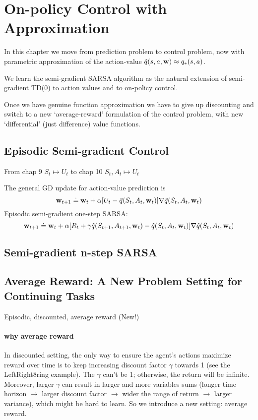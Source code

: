 \documentclass[sutton_barto_notes.tex]{subfiles}
\begin{document}
\newpage
\section{On-policy Control with Approximation}

In this chapter we move from prediction problem to control problem, now with parametric approximation of the action-value $\hat{q}(s,a,{\operatorname*{\mathbf{w}}})\approx q_*(s,a)$.

We learn the semi-gradient SARSA algorithm as the natural extension of semi-gradient TD(0) to action values and to on-policy control.

Once we have genuine function approximation we have to give up discounting and switch to a new `average-reward' formulation of the control problem, with new `differential' (just difference) value functions.

\subsection{Episodic Semi-gradient Control}

From chap 9 $S_t \mapsto U_t$ to chap 10 $S_t, A_t \mapsto U_t$

The general GD update for action-value prediction is
$${\operatorname*{\mathbf{w}}}_{t+1} \doteq {\operatorname*{\mathbf{w}}}_t + \alpha[U_t - \hat{q}(S_t, A_t, {\operatorname*{\mathbf{w}}}_t)]\nabla \hat{q}(S_t, A_t, {\operatorname*{\mathbf{w}}}_t)$$
Episodic semi-gradient one-step SARSA:
$${\operatorname*{\mathbf{w}}}_{t+1} \doteq {\operatorname*{\mathbf{w}}}_t + \alpha[R_{t} + \gamma\hat{q}(S_{t+1}, A_{t+1}, {\operatorname*{\mathbf{w}}}_t) - \hat{q}(S_t, A_t, {\operatorname*{\mathbf{w}}}_t)]\nabla\hat{q}(S_t, A_t, {\operatorname*{\mathbf{w}}}_t)$$

\subsection{Semi-gradient n-step SARSA}
\subsection{Average Reward: A New Problem Setting for Continuing Tasks}
Episodic, discounted, average reward (New!)

\paragraph{why average reward} In discounted setting, the only way to ensure the agent's actions maximize reward over time is to keep increasing discount factor $\gamma$ towards 1 (see the LeftRight8ring example). The $\gamma$ can't be 1; otherwise, the return will be infinite. Moreover, larger $\gamma$ can result in larger and more variables sums (longer time horizon $\to$ larger discount factor $\to$ wider the range of return $\to$ larger variance), which might be hard to learn. So we introduce a new setting: average reward.
\end{document}
